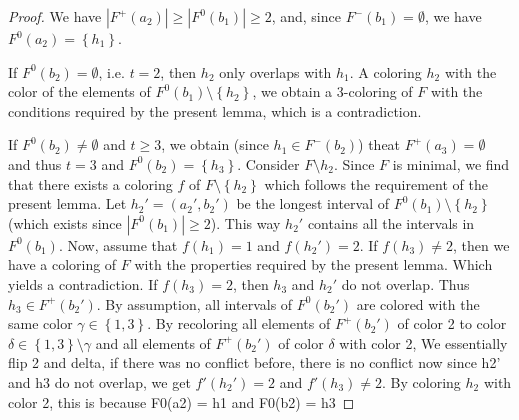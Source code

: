 \documentclass[12pt]{article}
\theoremstyle{definition}
\begin{document}
\begin{proof}
        We have $\left|F^{+}\left(a_{2}\right)\right| \geq
        \left|F^{0}\left(b_1\right)\right| \geq 2$,
        and, since $F^{-}\left(b_1\right) = \emptyset$,
        we have $F^{0}\left(a_2\right)
        = \left\{h_1\right\}$.
        
        If $F^{0}\left(b_2\right) = \emptyset$,
        i.e. $t=2$, then $h_2$
        only overlaps with $h_1$.
        A coloring $h_2$ with the color
        of the elements of $F^{0}\left(b_1\right)
        \setminus \left\{h_2\right\}$,
        we obtain a 3-coloring of $F$ with
        the conditions required by
        the present lemma, which is a
        contradiction.
        
        If $F^{0}\left(b_2\right) \neq \emptyset$
        and $t \geq 3$,
        we obtain (since $h_1 \in
        F^{-}\left(b_2\right)$)
        theat $F^{+}\left(a_3\right)=\emptyset$ 
        and thus $t=3$
        and $F^{0}\left(b_2\right) = \left\{h_3\right\}$.
        Consider $F \setminus h_2$.
        Since $F$ is minimal,
        we find that there exists
        a coloring $f$ of $F \setminus \left\{h_2\right\}$
        which follows the requirement
        of the present lemma.
        Let $h_2' = \left(a_2', b_2'\right)$
        be the longest interval of 
        $F^{0}\left(b_1\right) \setminus \left\{h_2\right\}$
        (which exists since $\left|F^{0}\left(b_1\right)\right|
        \geq 2$). This way
        $h_2'$ contains all
        the intervals in
        $F^{0}\left(b_1\right)$.
        Now, assume that $f\left(h_1\right) = 1$
        and $f\left(h_2'\right) = 2$.
        If $f\left(h_3\right)\neq 2$,
        then we have a coloring 
        of $F$ with the properties
        required by the present lemma.
        Which yields a contradiction.
        If $f\left(h_3\right) = 2$,
        then $h_3$ and $h_2'$
        do not overlap. Thus $h_3 \in F^{+}\left(b_2'\right)$.
        By assumption, all intervals
        of $F^{0}\left(b_2'\right)$ 
        are colored with the same color
        $\gamma \in \left\{1,3\right\}$.
        By recoloring all elements
        of $F^{+}\left(b_2'\right)$
        of color 2 to color 
        $\delta \in \left\{1,3\right\}
        \setminus \gamma$
        and all elements of $F^{+}\left(b_2'\right)$ 
        of color $\delta$ with color 2,
        {We essentially flip 2 and delta,
        if there was no conflict
        before, there is no conflict
        now} 
        {since h2' and h3 do not
        overlap}, we get
        $f'\left(h_2'\right)=2$ and
        $f'\left(h_3\right) \neq 2$.
        By coloring $h_2$ with
        color 2, 
        {this is because F0(a2)
        = {h1} and
        F0(b2) = {h3}}
    \end{proof}
    
\end{document}
